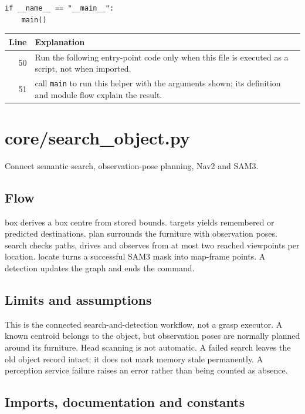 \documentclass[11pt,a4paper]{book}
\begin{document}
\begin{lstlisting}[firstnumber=50]
if __name__ == "__main__":
    main()
\end{lstlisting}

\begin{longtable}{r p{}}

\textbf{Line} & \textbf{Explanation} \\ \hline \endhead

50 & Run the following entry-point code only when this file is executed as a script, not when imported. \\

51 & call \texttt{main} to run this helper with the arguments shown; its definition and module flow explain the result. \\

\end{longtable}

\chapter{core/search\_object.py}

Connect semantic search, observation-pose planning, Nav2 and SAM3.

\section*{Flow}

box derives a box centre from stored bounds. targets yields remembered or predicted destinations. plan surrounds the furniture with observation poses. search checks paths, drives and observes from at most two reached viewpoints per location. locate turns a successful SAM3 mask into map-frame points. A detection updates the graph and ends the command.

\section*{Limits and assumptions}

This is the connected search-and-detection workflow, not a grasp executor. A known centroid belongs to the object, but observation poses are normally planned around its furniture. Head scanning is not automatic. A failed search leaves the old object record intact; it does not mark memory stale permanently. A perception service failure raises an error rather than being counted as absence.

\section{Imports, documentation and constants}
\end{document}
